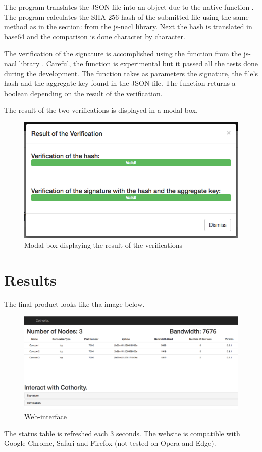 \documentclass[11pt, a4paper, twoside, openright, openany]{book} %
\begin{document}
The program translates the JSON file into an object due to the native function .
\newline
The program calculates the SHA-256 hash of the submitted file using the same method as in the
section:  from the js-nacl library.
Next the hash is translated in base64 and the comparison is done character by character.
\bigbreak

The verification of the signature is accomplished using the function
from the js-nacl library .
\newline
Careful, the function is experimental but it passed all the tests done during the development.
\newline
The function takes as parameters the signature, the file's hash and the aggregate-key found in
the JSON file. The function returns a boolean depending on the result of the verification.
\bigbreak

The result of the two verifications is displayed in a modal box.
\bigbreak

\begin{figure}[ht!]
\centering
\includegraphics[width=125mm]{modal.jpg}
\caption{Modal box displaying the result of the verifications}
\end{figure}
\leavevmode \newline

\chapter{Results}
The final product looks like tha image below.
\bigbreak

\begin{figure}[ht!]
\centering
\includegraphics[width=125mm]{interface.jpg}
\caption{Web-interface}
\end{figure}
\leavevmode \newline
The status table is refreshed each 3 seconds.
The website is compatible with Google Chrome, Safari and Firefox (not tested on Opera and Edge).
\iffalse
\end{document}

